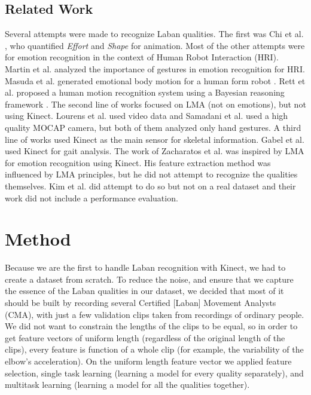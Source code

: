 \documentclass[11pt,twocolumn,varwidth=true,a4paper,fleqn]{article}
\begin{document}
\subsection{Related Work}
Several attempts were made to recognize Laban qualities. The first was Chi et al. \cite{chi2000emote}, who quantified \textit{Effort} and \textit{Shape} for animation. Most of the other attempts were for emotion recognition in the context of Human Robot Interaction (HRI). Martin et al. \cite{martin} analyzed the importance of gestures in emotion recognition for HRI. Masuda et al. generated emotional body motion for a human 
form robot \cite{Masuda}. Rett et al. proposed a human motion recognition 
system using a Bayesian reasoning framework \cite{Rett}. The second line of works focused on LMA (not on emotions), but not using Kinect. Lourens et al. \cite{lourens2010communicating} used video data and Samadani et al.
\cite{samadani2013laban} used a high quality MOCAP camera, but both of them
analyzed only hand gestures. A third line of works used Kinect as the main
sensor for skeletal information. Gabel et al.
\cite{gabel2012full} used Kinect for gait analysis. The work of
Zacharatos et al. \cite{Zacharatos} was inspired by LMA for emotion recognition using Kinect. His feature extraction method was influenced by LMA principles, but he did not attempt to recognize the qualities themselves. Kim et al. \cite{kim} did attempt to do so but not on a real dataset and their work did not include a performance evaluation.
\section{Method}
Because we are the first to handle Laban recognition with
Kinect, we had to create a dataset from scratch. To reduce the noise, and ensure that we capture the essence of the Laban qualities in our dataset, we decided that most of it should be built by recording several Certified [Laban] Movement Analysts (CMA), with just a few validation clips taken from recordings of ordinary people. We did not want to constrain the lengths of the clips to be equal, so in order to get feature vectors of uniform length (regardless of the original length of the clips),
every feature is function of a whole clip (for example, the variability of the
elbow's acceleration). On the uniform length feature vector we applied feature
selection, single task learning (learning a model for every quality separately),
and multitask learning (learning a model for all the qualities together).
\end{document}
